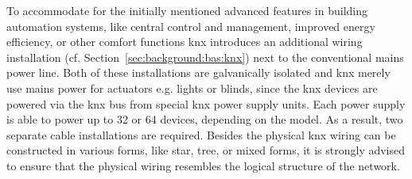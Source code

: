 To accommodate for the initially mentioned advanced features in building automation systems, like central control and management, improved energy efficiency, or other comfort functions \gls{knx} introduces an additional wiring installation (cf. Section~\ref{sec:background:bas:knx}) next to the conventional mains power line. Both of these installations are galvanically isolated and \gls{knx} merely use mains power for actuators e.g. lights or blinds, since the \gls{knx} devices are powered via the \gls{knx} bus from special \gls{knx} power supply units.
Each power supply is able to power up to 32 or 64 devices, depending on the model.
As a result, two separate cable installations are required.
Besides the physical \gls{knx} wiring can be constructed in various forms, like star, tree, or mixed forms, it is strongly advised to ensure that the physical wiring resembles the logical structure of the network. \parencite{Sokollik2017,Merz2009} 

